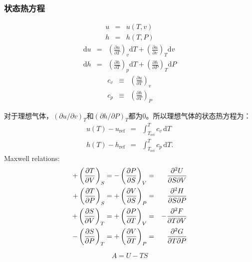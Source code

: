 \subsubsection{状态热方程}
\begin{multicols}{2}
    \tiny
    \begin{eqnarray*}
        u&=&u(T,v)\\
        h&=&h(T, P)
    \end{eqnarray*}
    \begin{eqnarray*}
        \mathrm{d}u&=&\left({\frac{\partial u}{\partial T}}\right)_{v}\mathrm{d}T+\left({\frac{\partial u}{\partial v}}\right)_{T}\mathrm{d}v\\ 
        \mathrm{d}h&=&\left({\frac{\partial h}{\partial T}}\right)_{p}\mathrm{d}T+\left({\frac{\partial h}{\partial P}}\right)_{T}\mathrm{d}P
    \end{eqnarray*}
    \begin{eqnarray*}
        c_{v}&\equiv&\left(\frac{\partial u}{\partial T}\right)_{v}\\
    c_{p}&\equiv&\left({\frac{\partial h}{\partial T}}\right)_{P}
    \end{eqnarray*}
    
    对于理想气体，$(\partial u/\partial v)_T$和$(\partial h/\partial P)_{T}$都为0。所以理想气体的状态热方程为：
    \begin{eqnarray*}
        u(T)-u_{\mathrm{ref}}&=&\int_{T_{\mathrm{ref}}}^{T}c_{v}\,\mathrm{d}T\\ 
        h(T)-h_{\mathrm{ref}}&=&\int_{T_{\mathrm{ref}}}^{T}c_{p}\,\mathrm{d}T.
    \end{eqnarray*}
    Maxwell relations:
    \begin{eqnarray*}
        +\left(\frac{\partial T}{\partial V}\right)_{S} = -\left(\frac{\partial P}{\partial S}\right)_{V} &=& \frac{\partial^2 U}{\partial S \partial V} \\
        +\left(\frac{\partial T}{\partial P}\right)_{S} = +\left(\frac{\partial V}{\partial S}\right)_{P} &=& \frac{\partial^2 H}{\partial S \partial P} \\
        +\left(\frac{\partial S}{\partial V}\right)_{T} = +\left(\frac{\partial P}{\partial T}\right)_{V} &=& -\frac{\partial^2 F}{\partial T \partial V} \\
        -\left(\frac{\partial S}{\partial P}\right)_{T} = +\left(\frac{\partial V}{\partial T}\right)_{P} &=& \frac{\partial^2 G}{\partial T \partial P}
    \end{eqnarray*}

    \begin{equation}
        A = U-TS
    \end{equation}
\end{multicols}


